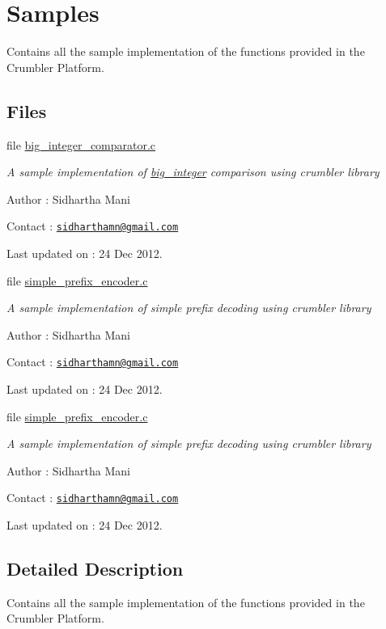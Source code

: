 \hypertarget{group__samples}{\section{Samples}
\label{group__samples}
}


Contains all the sample implementation of the functions provided in the Crumbler Platform.  


\subsection*{Files}
\begin{DoxyCompactItemize}
\item 
file \hyperlink{big__integer__comparator_8c}{big\-\_\-integer\-\_\-comparator.\-c}
\begin{DoxyCompactList}\small\item\em A sample implementation of \hyperlink{big__integer__impl_8h_structbig__integer}{big\-\_\-integer} comparison using crumbler library \par
 Author \-: Sidhartha Mani \par
 Contact \-: \href{mailto:sidharthamn@gmail.com}{\tt sidharthamn@gmail.\-com} \par
 Last updated on \-: 24 Dec 2012. \end{DoxyCompactList}\item 
file \hyperlink{simple__prefix__encoder_8c}{simple\-\_\-prefix\-\_\-encoder.\-c}
\begin{DoxyCompactList}\small\item\em A sample implementation of simple prefix decoding using crumbler library \par
 Author \-: Sidhartha Mani \par
 Contact \-: \href{mailto:sidharthamn@gmail.com}{\tt sidharthamn@gmail.\-com} \par
 Last updated on \-: 24 Dec 2012. \end{DoxyCompactList}\item 
file \hyperlink{simple__prefix__encoder_8c}{simple\-\_\-prefix\-\_\-encoder.\-c}
\begin{DoxyCompactList}\small\item\em A sample implementation of simple prefix decoding using crumbler library \par
 Author \-: Sidhartha Mani \par
 Contact \-: \href{mailto:sidharthamn@gmail.com}{\tt sidharthamn@gmail.\-com} \par
 Last updated on \-: 24 Dec 2012. \end{DoxyCompactList}\end{DoxyCompactItemize}


\subsection{Detailed Description}
Contains all the sample implementation of the functions provided in the Crumbler Platform. 